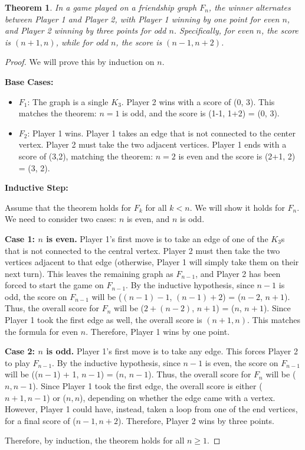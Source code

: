 \documentclass{article}
\newtheorem{theorem}{Theorem}
\begin{document}
\begin{theorem}
    In a game played on a friendship graph $F_n$, the winner alternates between Player 1 and Player 2, with Player 1 winning by one point for even $n$, and Player 2 winning by three points for odd $n$.  Specifically, for even $n$, the score is $(n +1, n)$, while for odd $n$, the score is $(n- 1, n + 2)$.
\end{theorem}

\begin{proof}
We will prove this by induction on $n$.

\textbf{Base Cases:}

\begin{itemize}
    \item $F_1$:  The graph is a single $K_3$. Player 2 wins with a score of (0, 3). This matches the theorem: $n=1$ is odd, and the score is (1-1, 1+2) = (0, 3).
    \item $F_2$: Player 1 wins. Player 1 takes an edge that is not connected to the center vertex. Player 2 must take the two adjacent vertices.  Player 1 ends with a score of (3,2), matching the theorem: $n=2$ is even and the score is (2+1, 2) = (3, 2).
\end{itemize}

\textbf{Inductive Step:}

Assume that the theorem holds for $F_k$ for all $k < n$.  We will show it holds for $F_n$. We need to consider two cases: $n$ is even, and $n$ is odd.

\textbf{Case 1: $n$ is even.} Player 1's first move is to take an edge of one of the $K_3$s that is not connected to the central vertex.  Player 2 must then take the two vertices adjacent to that edge (otherwise, Player 1 will simply take them on their next turn). This leaves the remaining graph as $F_{n-1}$, and Player 2 has been forced to start the game on $F_{n-1}$. By the inductive hypothesis, since $n-1$ is odd, the score on $F_{n-1}$ will be ($(n-1) - 1$, $(n-1) + 2$) = ($n-2$, $n+1$). Thus, the overall score for $F_n$ will be ($2 + (n-2)$, $n+1$) = ($n$, $n+1$).  Since Player 1 took the first edge as well, the overall score is $(n+1, n)$. This matches the formula for even $n$. Therefore, Player 1 wins by one point.

\textbf{Case 2: $n$ is odd.} Player 1's first move is to take any edge. This forces Player 2 to play $F_{n-1}$.  By the inductive hypothesis, since $n-1$ is even, the score on $F_{n-1}$ will be  (($n-1$) + 1, $n-1$) = ($n$, $n-1$).  Thus, the overall score for $F_n$ will be ($n, n-1$). Since Player 1 took the first edge, the overall score is either ($n+1, n-1$) or ($n, n$), depending on whether the edge came with a vertex. However, Player 1 could have, instead, taken a loop from one of the end vertices, for a final score of ($n-1, n+2$). Therefore, Player 2 wins by three points.

Therefore, by induction, the theorem holds for all $n \ge 1$.
\end{proof}
\end{document}
